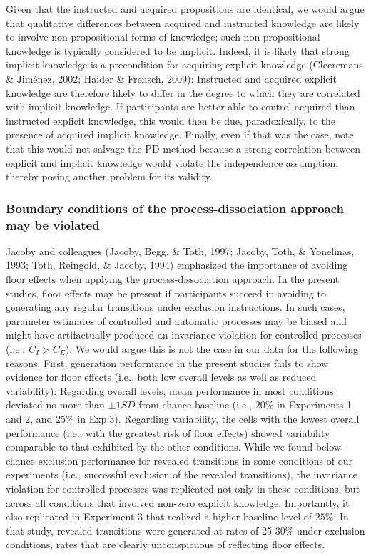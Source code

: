 \documentclass[man]{apa6}
\theoremstyle{definition}
\theoremstyle{definition}
\theoremstyle{definition}
\theoremstyle{remark}
\begin{document}
Given that the instructed and acquired propositions are identical, we
would argue that qualitative differences between acquired and instructed
knowledge are likely to involve non-propositional forms of knowledge;
such non-propositional knowledge is typically considered to be implicit.
Indeed, it is likely that strong implicit knowledge is a precondition
for acquiring explicit knowledge (Cleeremans \& Jiménez, 2002; Haider \&
Frensch, 2009): Instructed and acquired explicit knowledge are therefore
likely to differ in the degree to which they are correlated with
implicit knowledge. If participants are better able to control acquired
than instructed explicit knowledge, this would then be due,
paradoxically, to the presence of acquired implicit knowledge. Finally,
even if that was the case, note that this would not salvage the PD
method because a strong correlation between explicit and implicit
knowledge would violate the independence assumption, thereby posing
another problem for its validity.

\subsubsection{Boundary conditions of the process-dissociation approach
may be
violated}\label{boundary-conditions-of-the-process-dissociation-approach-may-be-violated}

Jacoby and colleagues (Jacoby, Begg, \& Toth, 1997; Jacoby, Toth, \&
Yonelinas, 1993; Toth, Reingold, \& Jacoby, 1994) emphasized the
importance of avoiding floor effects when applying the
process-dissociation approach. In the present studies, floor effects may
be present if participants succeed in avoiding to generating any regular
transitions under exclusion instructions. In such cases, parameter
estimates of controlled and automatic processes may be biased and might
have artifactually produced an invariance violation for controlled
processes (i.e., \(C_I > C_E\)). We would argue this is not the case in
our data for the following reasons: First, generation performance in the
present studies fails to show evidence for floor effects (i.e., both low
overall levels as well as reduced variability): Regarding overall
levels, mean performance in most conditions deviated no more than
\(\pm 1 \mathit{SD}\) from chance baseline (i.e., \(20\%\) in
Experiments 1 and 2, and \(25\%\) in Exp.3). Regarding variability, the
cells with the lowest overall performance (i.e., with the greatest risk
of floor effects) showed variability comparable to that exhibited by the
other conditions. While we found below-chance exclusion performance for
revealed transitions in some conditions of our experiments (i.e.,
successful exclusion of the revealed transitions), the invariance
violation for controlled processes was replicated not only in these
conditions, but across all conditions that involved non-zero explicit
knowledge. Importantly, it also replicated in Experiment 3 that realized
a higher baseline level of \(25\%\): In that study, revealed transitions
were generated at rates of 25-30\% under exclusion conditions, rates
that are clearly unconspicuous of reflecting floor effects.
\end{document}
